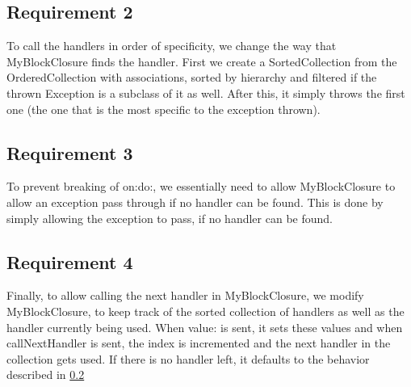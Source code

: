 \documentclass[a4paper]{article}
\begin{document}
\subsection{Requirement 2}
To call the handlers in order of specificity, we change the way that
MyBlockClosure finds the handler. First we create a SortedCollection from the
OrderedCollection with associations, sorted by hierarchy and filtered if the
thrown Exception is a subclass of it as well. After this, it simply throws the
first one (the one that is the most specific to the exception thrown).
\subsection{Requirement 3}
\label{subsection:requirement-3}
To prevent breaking of on:do:, we essentially need to allow MyBlockClosure to
allow an exception pass through if no handler can be found. This is done by
simply allowing the exception to pass, if no handler can be found.
\subsection{Requirement 4}
Finally, to allow calling the next handler in MyBlockClosure, we modify
MyBlockClosure, to keep track of the sorted collection of handlers as well as
the handler currently being used. When value: is sent, it sets these values and
when callNextHandler is sent, the index is incremented and the next handler in
the collection gets
used. If there is no handler left, it defaults to the behavior described in
\ref{subsection:requirement-3}
\end{document}
